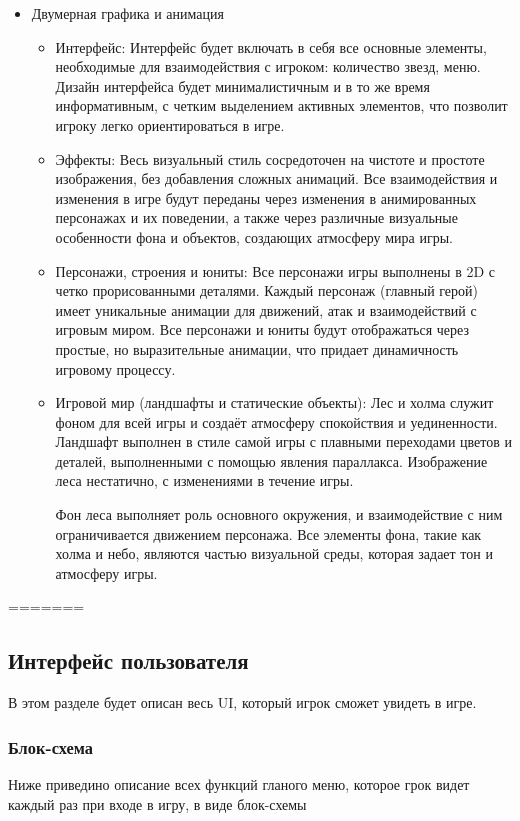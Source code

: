 \documentclass{article}
\begin{document}
\begin{itemize}
    \item Двумерная графика и анимация
    \begin{itemize}
        \item Интерфейс:
        Интерфейс будет включать в себя все основные элементы, необходимые для взаимодействия с игроком: количество звезд, меню. Дизайн интерфейса будет минималистичным и в то же время информативным, с четким выделением активных элементов, что позволит игроку легко ориентироваться в игре.
        \item Эффекты:
        Весь визуальный стиль сосредоточен на чистоте и простоте изображения, без добавления сложных анимаций. Все взаимодействия и изменения в игре будут переданы через изменения в анимированных персонажах и их поведении, а также через различные визуальные особенности фона и объектов, создающих атмосферу мира игры.
        \item Персонажи, строения и юниты:
        Все персонажи игры выполнены в 2D с четко прорисованными деталями. Каждый персонаж (главный герой) имеет уникальные анимации для движений, атак и взаимодействий с игровым миром. Все персонажи и юниты будут отображаться через простые, но выразительные анимации, что придает динамичность игровому процессу.
        \item Игровой мир (ландшафты и статические объекты):
        Лес и холма служит фоном для всей игры и создаёт атмосферу спокойствия и уединенности. Ландшафт выполнен в стиле самой игры с плавными переходами цветов и деталей, выполненными с помощью явления параллакса. Изображение леса нестатично, с изменениями в течение игры.
        
        Фон леса выполняет роль основного окружения, и взаимодействие с ним ограничивается движением персонажа. Все элементы фона, такие как холма и небо, являются частью визуальной среды, которая задает тон и атмосферу игры.
    \end{itemize}
\end{itemize}
=======


\subsection{Интерфейс пользователя}
В этом разделе будет описан весь UI, который игрок сможет увидеть в игре.

\subsubsection{Блок-схема}
Ниже приведино описание всех функций гланого меню, которое грок видет каждый раз при входе в игру, в виде блок-схемы
\end{document}
